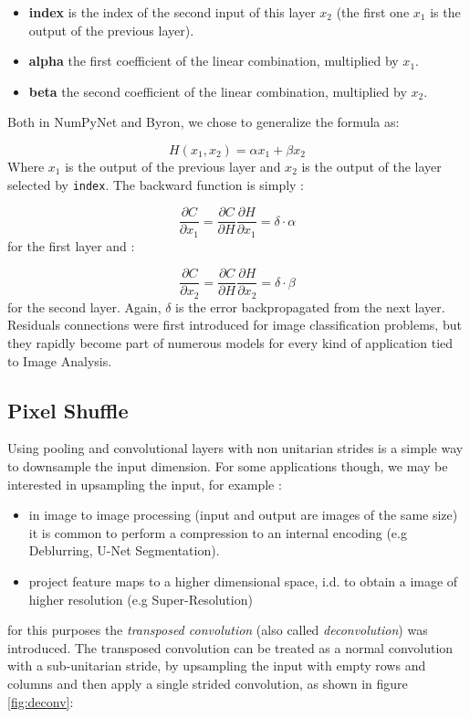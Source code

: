 \documentclass[12pt,a4paper]{report}
\begin{document}
\begin{itemize}
 \setlength\itemsep{-0.2em}
 \item {\bf index} is the index of the second input of this layer $x_2$ (the first one $x_1$ is the output of the previous layer).
 \item {\bf alpha} the first coefficient of the linear combination, multiplied by $x_1$.
 \item {\bf beta} the second coefficient of the linear combination, multiplied by $x_2$.
\end{itemize}
Both in NumPyNet and Byron, we chose to generalize the formula as: 

\begin{equation}
 H(x_1, x_2) = \alpha x_1 + \beta x_2
\end{equation}
Where $x_1$ is the output of the previous layer and $x_2$ is the output of the layer selected by \texttt{index}.
The backward function is simply :

\begin{equation}
 \frac{\partial C}{\partial x_1} = \frac{\partial C}{\partial H}\frac{\partial H}{\partial x_1} = \delta \cdot \alpha
\end{equation}
for the first layer and :

\begin{equation}
 \frac{\partial C}{\partial x_2} = \frac{\partial C}{\partial H}\frac{\partial H}{\partial x_2} = \delta \cdot \beta
\end{equation}
for the second layer. Again, $\delta$ is the error backpropagated from the next layer. 
Residuals connections were first introduced for image classification problems, but they rapidly become part of numerous models for every kind of application tied to Image Analysis.

\subsection*{Pixel Shuffle}

Using pooling and convolutional layers with non unitarian strides is a simple way to downsample the input dimension. 
For some applications though, we may be interested in upsampling the input, for example : 

\begin{itemize}
 \setlength\itemsep{-0.2em}
 \item in image to image processing (input and output are images of the same size) it is common to perform a compression to an internal encoding (e.g Deblurring, U-Net Segmentation). 
 \item project feature maps to a higher dimensional space, i.d. to obtain a image of higher resolution (e.g Super-Resolution)
\end{itemize}
for this purposes the {\it transposed convolution} (also called {\it deconvolution}) was introduced. 
The transposed convolution can be treated as a normal convolution with a sub-unitarian stride, by upsampling the input with empty rows and columns and then apply a single strided convolution, as shown in figure \ref{fig:deconv}:
\end{document}
